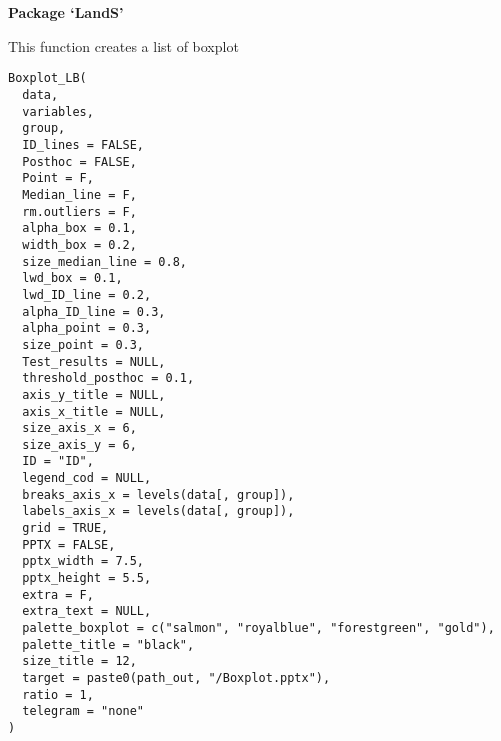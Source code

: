 \documentclass[a4paper]{book}
\begin{document}
\chapter*{}
\begin{center}
{\textbf{\huge Package `LandS'}}
\par\bigskip{\large \today}
\end{center}
\begin{description}
\raggedright{}
\item[Type]
\item[Title]
\item[Version]
\item[Author]
\item[Maintainer]\AsIs{}
\item[Description]
\item[License]
\item[Encoding]
\item[LazyData]
\item[RoxygenNote]
\end{description}
%
\begin{Description}
This function creates a list of boxplot
\end{Description}
%
\begin{Usage}
\begin{verbatim}
Boxplot_LB(
  data,
  variables,
  group,
  ID_lines = FALSE,
  Posthoc = FALSE,
  Point = F,
  Median_line = F,
  rm.outliers = F,
  alpha_box = 0.1,
  width_box = 0.2,
  size_median_line = 0.8,
  lwd_box = 0.1,
  lwd_ID_line = 0.2,
  alpha_ID_line = 0.3,
  alpha_point = 0.3,
  size_point = 0.3,
  Test_results = NULL,
  threshold_posthoc = 0.1,
  axis_y_title = NULL,
  axis_x_title = NULL,
  size_axis_x = 6,
  size_axis_y = 6,
  ID = "ID",
  legend_cod = NULL,
  breaks_axis_x = levels(data[, group]),
  labels_axis_x = levels(data[, group]),
  grid = TRUE,
  PPTX = FALSE,
  pptx_width = 7.5,
  pptx_height = 5.5,
  extra = F,
  extra_text = NULL,
  palette_boxplot = c("salmon", "royalblue", "forestgreen", "gold"),
  palette_title = "black",
  size_title = 12,
  target = paste0(path_out, "/Boxplot.pptx"),
  ratio = 1,
  telegram = "none"
)
\end{verbatim}
\end{Usage}
\end{document}
